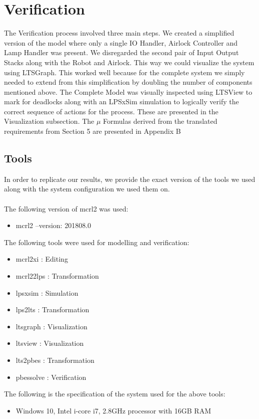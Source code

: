 \documentclass[a4paper,12pt]{article}
\begin{document}
\section{Verification}
The Verification process involved three main steps. We created a simplified version of the model where only a single IO Handler, Airlock Controller and Lamp Handler was present. We disregarded the second pair of Input Output Stacks along with the Robot and Airlock. This way we could visualize the system using LTSGraph. This worked well because for the complete system we simply needed to extend from this simplification by doubling the number of components mentioned above. The Complete Model was visually inspected using LTSView to mark for deadlocks along with an LPSxSim simulation to logically verify the correct sequence of actions for the process. These are presented in the Visualization subsection. The $\mu$ Formulas derived from the translated requirements from Section 5 are presented in Appendix B 
\subsection{Tools}
In order to replicate our results, we provide the exact version of the tools we used along with the system configuration we used them on.
\\
\\The following version of mcrl2 was used:
\begin{itemize}
    \item mcrl2 --version: 201808.0
\end{itemize}
The following tools were used for modelling and verification:
\begin{itemize}
    \item mcrl2xi : Editing
    \item mcrl22lps : Transformation
    \item lpsxsim : Simulation
    \item lps2lts : Transformation
    \item ltsgraph : Visualization
    \item ltsview : Visualization
    \item lts2pbes : Transformation
    \item pbessolve : Verification
\end{itemize}
The following is the specification of the system used for the above tools:
\begin{itemize}
    \item Windows 10, Intel i-core i7, 2.8GHz processor with 16GB RAM 
\end{itemize}
\end{document}
